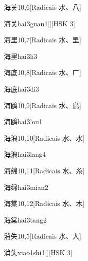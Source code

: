 \begin{entry}{海关}{10,6}[Radicais ⽔、⼋]
  \begin{phonetics}{海关}{hai3guan1}[][HSK 3]
  \end{phonetics}
\end{entry}

\begin{entry}{海里}{10,7}[Radicais ⽔、⾥]
  \begin{phonetics}{海里}{hai3li3}
  \end{phonetics}
\end{entry}

\begin{entry}{海底}{10,8}[Radicais ⽔、⼴]
  \begin{phonetics}{海底}{hai3di3}
  \end{phonetics}
\end{entry}

\begin{entry}{海鸥}{10,9}[Radicais ⽔、⿃]
  \begin{phonetics}{海鸥}{hai3'ou1}
  \end{phonetics}
\end{entry}

\begin{entry}{海浪}{10,10}[Radicais ⽔、⽔]
  \begin{phonetics}{海浪}{hai3lang4}
  \end{phonetics}
\end{entry}

\begin{entry}{海绵}{10,11}[Radicais ⽔、⽷]
  \begin{phonetics}{海绵}{hai3mian2}
  \end{phonetics}
\end{entry}

\begin{entry}{海棠}{10,12}[Radicais ⽔、⽊]
  \begin{phonetics}{海棠}{hai3tang2}
  \end{phonetics}
\end{entry}

\begin{entry}{消失}{10,5}[Radicais ⽔、⼤]
  \begin{phonetics}{消失}{xiao1shi1}[][HSK 3]
  \end{phonetics}
\end{entry}

